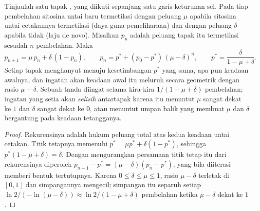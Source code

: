 \begin{theorem}\label{thm:b3:chromatin-epigenetics:maintenance}
Tinjaulah satu tapak , yang diikuti sepanjang satu garis keturunan sel.
Pada tiap pembelahan sitosina untai baru termetilasi dengan peluang $\mu$
apabila sitosina untai cetakannya termetilasi (daya guna pemeliharaan) dan
dengan peluang $\delta$ apabila tidak (laju de novo). Misalkan $p_{n}$ adalah
peluang tapak itu termetilasi sesudah $n$ pembelahan. Maka
\[
p_{n+1} = \mu\, p_{n} + \delta\,(1 - p_{n}),
\qquad
p_{n} = p^{*} + (p_{0} - p^{*})\,(\mu - \delta)^{n},
\qquad
p^{*} = \frac{\delta}{1 - \mu + \delta}.
\]
Setiap tapak menghanyut menuju kesetimbangan $p^{*}$ yang sama, apa pun
keadaan awalnya, dan ingatan akan keadaan awal itu meluruh secara geometrik
dengan rasio $\mu - \delta$. Sebuah tanda diingat selama kira-kira
$1/(1 - \mu + \delta)$ pembelahan; ingatan yang setia akan \emph{selisih}
antartapak karena itu menuntut $\mu$ sangat dekat ke $1$ dan $\delta$ sangat
dekat ke $0$, atau menuntut umpan balik yang membuat $\mu$ dan $\delta$
bergantung pada keadaan tetangganya.
\end{theorem}
\begin{proof}
Rekurensinya adalah hukum peluang total atas kedua keadaan untai cetakan.
Titik tetapnya memenuhi $p^{*} = \mu p^{*} + \delta(1 -
p^{*})$, sehingga $p^{*}(1 - \mu + \delta) = \delta$. Dengan mengurangkan persamaan titik tetap
itu dari rekurensinya diperoleh $p_{n+1} - p^{*} = (\mu -
\delta)(p_{n} - p^{*})$, yang bila diiterasi memberi bentuk tertutupnya. Karena
$0 \le \delta \le \mu \le 1$, rasio $\mu - \delta$ terletak di $[0,1]$ dan
simpangannya mengecil; simpangan itu separuh setiap $\ln 2 / (-\ln(\mu -
\delta)) \approx \ln 2/(1 - \mu + \delta)$ pembelahan ketika $\mu -
\delta$ dekat ke $1$.
\end{proof}

